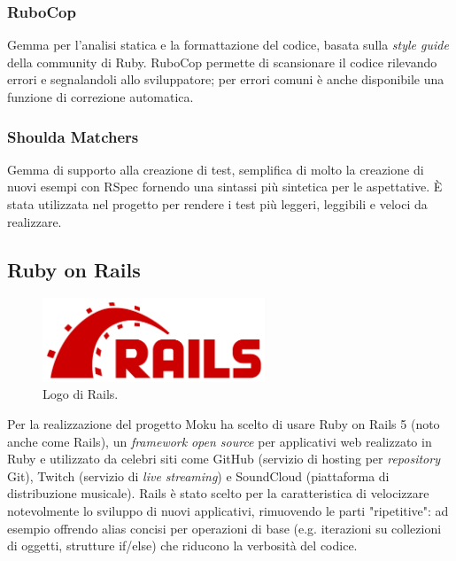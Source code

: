 \subsubsection{RuboCop}
Gemma per l'analisi statica e la formattazione del codice, basata sulla \textit{style guide} della community di Ruby. RuboCop permette di scansionare il codice rilevando errori e segnalandoli allo sviluppatore; per errori comuni è anche disponibile una funzione di correzione automatica.

\subsubsection{Shoulda Matchers}
Gemma di supporto alla creazione di test, semplifica di molto la creazione di nuovi esempi con RSpec fornendo una sintassi più sintetica per le aspettative. È stata utilizzata nel progetto per rendere i test più leggeri, leggibili e veloci da realizzare.


\subsection{Ruby on Rails}
\label{sec:2.2.3}
\begin{figure}[h!]
    \centering
    \includegraphics[height=2.5cm]{figures/rails.png}
    \caption[Logo di Rails]{Logo di Rails.
    \label{fig:rails}}
\end{figure}
Per la realizzazione del progetto Moku ha scelto di usare Ruby on Rails 5 (noto anche come Rails), un \textit{framework} \textit{open source} per applicativi web realizzato in Ruby e utilizzato da celebri siti come GitHub (servizio di hosting per \textit{repository} Git), Twitch (servizio di \textit{live streaming}) e SoundCloud (piattaforma di distribuzione musicale)\cite{Rails}. Rails è stato scelto per la caratteristica di velocizzare notevolmente lo sviluppo di nuovi applicativi, rimuovendo le parti "ripetitive": ad esempio offrendo alias concisi per operazioni di base (e.g. iterazioni su collezioni di oggetti, strutture if/else) che riducono la verbosità del codice.

